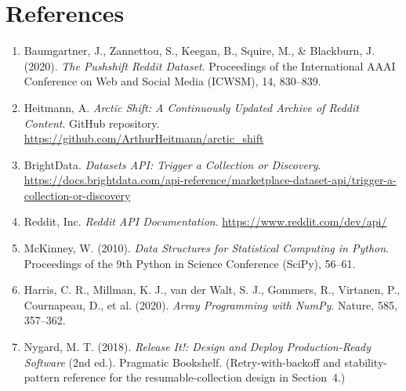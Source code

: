 \documentclass[12pt]{article}
\begin{document}
\section{References}

\begin{enumerate}
    \item Baumgartner, J., Zannettou, S., Keegan, B., Squire, M., \& Blackburn, J. (2020).
    \textit{The Pushshift Reddit Dataset}. Proceedings of the International AAAI Conference on
    Web and Social Media (ICWSM), 14, 830--839.

    \item Heitmann, A. \textit{Arctic Shift: A Continuously Updated Archive of Reddit Content}.
    GitHub repository. \url{https://github.com/ArthurHeitmann/arctic_shift}

    \item BrightData. \textit{Datasets API: Trigger a Collection or Discovery}. \\
    \small\url{https://docs.brightdata.com/api-reference/marketplace-dataset-api/trigger-a-collection-or-discovery}\normalsize

    \item Reddit, Inc. \textit{Reddit API Documentation}. \url{https://www.reddit.com/dev/api/}

    \item McKinney, W. (2010). \textit{Data Structures for Statistical Computing in Python}.
    Proceedings of the 9th Python in Science Conference (SciPy), 56--61.

    \item Harris, C. R., Millman, K. J., van der Walt, S. J., Gommers, R., Virtanen, P.,
    Cournapeau, D., et al. (2020). \textit{Array Programming with NumPy}. Nature, 585,
    357--362.

    \item Nygard, M. T. (2018). \textit{Release It!: Design and Deploy Production-Ready
    Software} (2nd ed.). Pragmatic Bookshelf. (Retry-with-backoff and stability-pattern
    reference for the resumable-collection design in Section~4.)
\end{enumerate}
\end{document}
